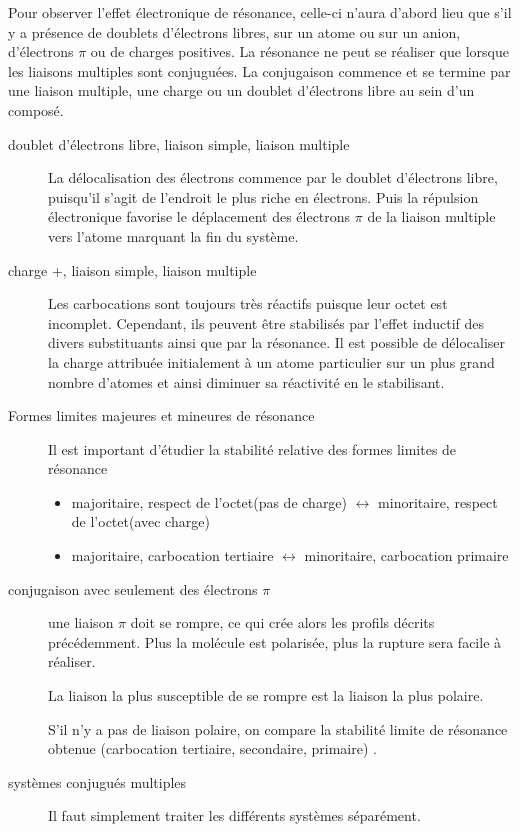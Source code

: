 Pour observer l'effet électronique de résonance, celle-ci n'aura d'abord lieu que s'il y a présence de doublets d'électrons libres, sur un atome ou sur un anion, d'électrons $\pi$ ou de charges positives.
La résonance ne peut se réaliser que lorsque les liaisons multiples sont conjuguées.
La conjugaison commence et se termine par une liaison multiple, une charge ou un doublet d'électrons libre au sein d'un composé.
\begin{description}
  \item[doublet d'électrons libre, liaison simple, liaison multiple]

    La délocalisation des électrons commence par le doublet d'électrons libre, puisqu'il s'agit de l'endroit le plus riche en électrons.
    Puis la répulsion électronique favorise le déplacement des électrons $\pi$ de la liaison multiple vers l'atome marquant la fin du système.
  \item[charge +, liaison simple, liaison multiple]

    Les carbocations sont toujours très réactifs puisque leur octet est incomplet.
    Cependant, ils peuvent être stabilisés par l'effet inductif des divers substituants ainsi que par la résonance.
    Il est possible de délocaliser la charge attribuée initialement à un atome particulier sur un plus grand nombre d'atomes et ainsi diminuer sa réactivité en le stabilisant.

  \item[Formes limites majeures et mineures de résonance]

    Il est important d'étudier la stabilité relative des formes limites de résonance
    \begin{itemize}
      \item majoritaire, respect de l'octet(pas de charge) $\leftrightarrow$  minoritaire, respect de l'octet(avec charge)
      \item majoritaire, carbocation tertiaire $\leftrightarrow$  minoritaire, carbocation primaire
    \end{itemize}

  \item[conjugaison avec seulement des électrons $\pi$]


    une liaison $\pi$  doit se rompre, ce qui crée alors les profils décrits précédemment.
    Plus la molécule est polarisée, plus la rupture sera facile à réaliser.

    La liaison la plus susceptible de se rompre est la liaison la plus polaire.

    S'il n'y a pas de liaison polaire, on compare la stabilité limite de résonance obtenue (carbocation tertiaire, secondaire, primaire) .

  \item[systèmes conjugués multiples]

    Il faut simplement traiter les différents systèmes séparément.
\end{description}





